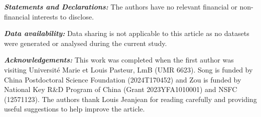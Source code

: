 \documentclass[10pt,a4paper]{article}
\theoremstyle{definition} \theoremstyle{remark}
\numberwithin{equation}{section}
\begin{document}
\medskip



\vskip0.3in

{\small \noindent \textit{\bf Statements and Declarations:} The authors have no relevant financial or non-financial interests to disclose.}

{\small \noindent \textit{\bf Data availability:} Data sharing is not applicable to this article as no datasets were generated or analysed during the current study.}


{\small \noindent \textit{\bf Acknowledgements:} This work was completed when the first author was visiting Universit\'e Marie et Louis Pasteur, LmB (UMR 6623). Song is funded by China Postdoctoral Science Foundation (2024T170452) and Zou is funded by National Key R\&D Program of China (Grant 2023YFA1010001) and NSFC (12571123). The authors thank Louis Jeanjean for reading carefully and providing useful suggestions to help improve the article.}


\newpage
\end{document}
